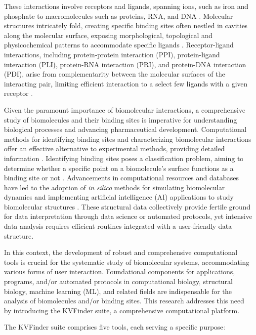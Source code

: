 \documentclass[Ingles]{phdthesis}
\begin{document}
These interactions involve receptors and ligands, spanning ions, such as iron and phosphate to macromolecules such as proteins, RNA, and DNA \cite{oliveira2014}. Molecular structures intricately fold, creating specific binding sites often nestled in cavities along the molecular surface, exposing morphological, topological and physicochemical patterns to accommodate specific ligands \cite{henrich2010,guerra2021}. Receptor-ligand interactions, including protein-protein interaction (PPI), protein-ligand interaction (PLI), protein-RNA interaction (PRI), and protein-DNA interaction (PDI), arise from complementarity between the molecular surfaces of the interacting pair, limiting efficient interaction to a select few ligands with a given receptor \cite{henrich2010,simoes2017}.

Given the paramount importance of biomolecular interactions, a comprehensive study of biomolecules and their binding sites is imperative for understanding biological processes and advancing pharmaceutical development. Computational methods for identifying binding sites and characterizing biomolecular interactions offer an effective alternative to experimental methods, providing detailed information \cite{simoes2017}. Identifying binding sites poses a classification problem, aiming to determine whether a specific point on a biomolecule's surface functions as a binding site or not \cite{sotriffer2002,henrich2010,simoes2017}. Advancements in computational resources and databases have led to the adoption of \textit{in silico} methods for simulating biomolecular dynamics and implementing artificial intelligence (AI) applications to study biomolecular structures \cite{tunyasuvunakool2021}. These structural data collectively provide fertile ground for data interpretation through data science or automated protocols, yet intensive data analysis requires efficient routines integrated with a user-friendly data structure.

In this context, the development of robust and comprehensive computational tools is crucial for the systematic study of biomolecular systems, accommodating various forms of user interaction. Foundational components for applications, programs, and/or automated protocols in computational biology, structural biology, machine learning (ML), and related fields are indispensable for the analysis of biomolecules and/or binding sites. This research addresses this need by introducing the KVFinder suite, a comprehensive computational platform.

The KVFinder suite comprises five tools, each serving a specific purpose:
\end{document}
